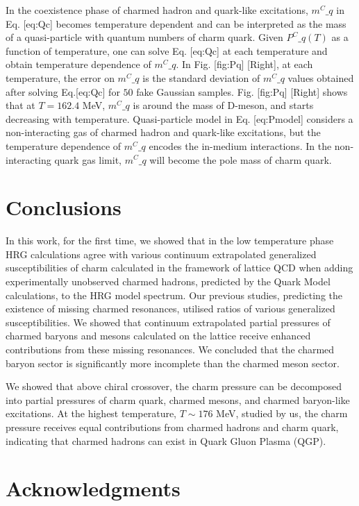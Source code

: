 \documentclass[11pt,a4paper]{article}
\begin{document}
In the coexistence phase of charmed hadron and quark-like excitations, $m^C\_q$ in Eq. [eq:Qc] becomes temperature dependent and can be interpreted as the mass of a quasi-particle with quantum numbers of charm quark. Given $P^C\_q(T)$ as a function of temperature, one can solve Eq. [eq:Qc] at each temperature and obtain temperature dependence of $m^C\_q$. In Fig. [fig:Pq] [Right], at each temperature, the error on $m^C\_q$ is the standard deviation of $m^C\_q$ values obtained after solving Eq.[eq:Qc] for $50$ fake Gaussian samples. Fig. [fig:Pq] [Right] shows that at $T=162.4$ MeV, $m^C\_q$ is around the mass of D-meson, and starts decreasing with temperature. Quasi-particle model in Eq. [eq:Pmodel] considers a non-interacting gas of charmed hadron and quark-like excitations, but the temperature dependence of $m^C\_q$ encodes the in-medium interactions. In the non-interacting quark gas limit, $m^C\_q$ will become the pole mass of charm quark.

\section{Conclusions}

In this work, for the first time, we showed that in the low temperature phase HRG calculations agree with various continuum extrapolated generalized susceptibilities of charm calculated in the framework of lattice QCD when adding
experimentally unobserved charmed hadrons, predicted by the Quark Model calculations, to the HRG model spectrum. Our previous studies, predicting the existence of missing charmed resonances, utilised ratios of various generalized susceptibilities. We showed that continuum extrapolated partial pressures of charmed baryons and mesons calculated on the lattice receive enhanced contributions from these missing resonances. We concluded that the charmed baryon sector is significantly more incomplete than the charmed meson sector.

We showed that above chiral crossover, the charm pressure can be decomposed into partial pressures of charm quark, charmed mesons, and charmed baryon-like excitations. At the highest temperature, $T \sim 176$ MeV, studied by us, the charm pressure receives equal contributions from charmed hadrons and charm quark, indicating that charmed hadrons can exist in Quark Gluon Plasma (QGP).

\section{Acknowledgments}
\end{document}
